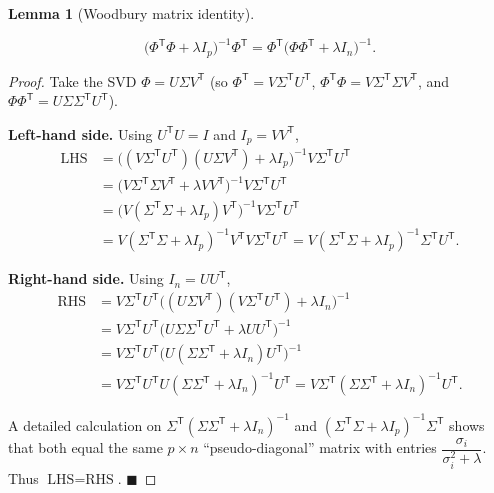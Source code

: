 \documentclass[
  letterpaper,
  DIV=11,
  numbers=noendperiod]{scrreprt}
\theoremstyle{definition}
\theoremstyle{plain}
\theoremstyle{plain}
\theoremstyle{definition}
\theoremstyle{plain}
\theoremstyle{plain}
\newtheorem{lemma}{Lemma}[chapter]
\theoremstyle{remark}
\begin{document}
\begin{lemma}[Woodbury matrix
identity]\protect\hypertarget{lem-woodbury}{}\label{lem-woodbury}

\[
\big(\Phi^{\mathsf T}\Phi + \lambda I_p\big)^{-1} \Phi^{\mathsf T}
= \Phi^{\mathsf T} \big(\Phi\Phi^{\mathsf T} + \lambda I_n\big)^{-1} .
\]

\end{lemma}

\begin{proof}
Take the SVD \(\Phi = U \Sigma V^{\mathsf T}\) (so
\(\Phi^{\mathsf T} = V \Sigma^{\mathsf T} U^{\mathsf T}\),
\(\Phi^{\mathsf T}\Phi = V \Sigma^{\mathsf T}\Sigma V^{\mathsf T}\), and
\(\Phi\Phi^{\mathsf T} = U \Sigma \Sigma^{\mathsf T} U^{\mathsf T}\)).

\textbf{Left-hand side.} Using \(U^{\mathsf T} U = I\) and
\(I_p = V V^{\mathsf T}\), \[
\begin{aligned}
\text{LHS}
&= \big((V\Sigma^{\mathsf T} U^{\mathsf T})(U\Sigma V^{\mathsf T}) + \lambda I_p\big)^{-1} V\Sigma^{\mathsf T} U^{\mathsf T} \\
&= \big(V\Sigma^{\mathsf T}\Sigma V^{\mathsf T} + \lambda V V^{\mathsf T}\big)^{-1} V\Sigma^{\mathsf T} U^{\mathsf T} \\
&= \big(V(\Sigma^{\mathsf T}\Sigma + \lambda I_p) V^{\mathsf T}\big)^{-1} V\Sigma^{\mathsf T} U^{\mathsf T} \\
&= V(\Sigma^{\mathsf T}\Sigma + \lambda I_p)^{-1} V^{\mathsf T} V\Sigma^{\mathsf T} U^{\mathsf T}
= V(\Sigma^{\mathsf T}\Sigma + \lambda I_p)^{-1}\Sigma^{\mathsf T} U^{\mathsf T} .
\end{aligned}
\]

\textbf{Right-hand side.} Using \(I_n = U U^{\mathsf T}\), \[
\begin{aligned}
\text{RHS}
&= V\Sigma^{\mathsf T} U^{\mathsf T}\big((U\Sigma V^{\mathsf T})(V\Sigma^{\mathsf T} U^{\mathsf T}) + \lambda I_n\big)^{-1} \\
&= V\Sigma^{\mathsf T} U^{\mathsf T}\big(U\Sigma\Sigma^{\mathsf T} U^{\mathsf T} + \lambda U U^{\mathsf T}\big)^{-1} \\
&= V\Sigma^{\mathsf T} U^{\mathsf T}\big(U(\Sigma\Sigma^{\mathsf T} + \lambda I_n) U^{\mathsf T}\big)^{-1} \\
&= V\Sigma^{\mathsf T} U^{\mathsf T} U(\Sigma\Sigma^{\mathsf T} + \lambda I_n)^{-1} U^{\mathsf T}
= V\Sigma^{\mathsf T}(\Sigma\Sigma^{\mathsf T} + \lambda I_n)^{-1} U^{\mathsf T} .
\end{aligned}
\]

A detailed calculation on
\(\Sigma^{\mathsf T}(\Sigma\Sigma^{\mathsf T} + \lambda I_n)^{-1}\) and
\((\Sigma^{\mathsf T}\Sigma + \lambda I_p)^{-1}\Sigma^{\mathsf T}\)
shows that both equal the same \(p \times n\) ``pseudo-diagonal'' matrix
with entries \(\dfrac{\sigma_i}{\sigma_i^2 + \lambda}\). Thus
\(\text{LHS} = \text{RHS}\). \(\blacksquare\)
\end{proof}
\end{document}
